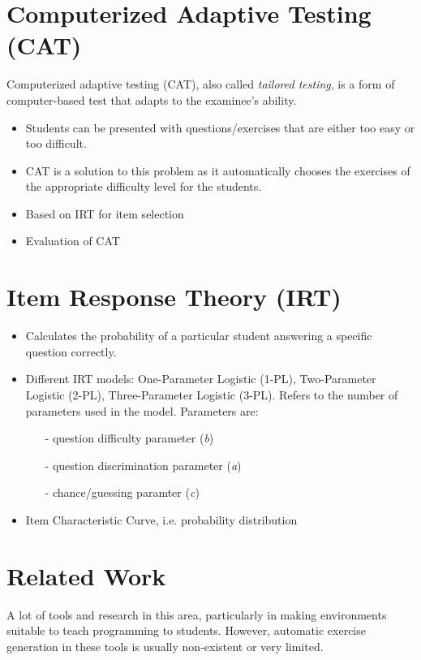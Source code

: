 \documentclass[11pt,a4paper]{report}
\begin{document}
\section{Computerized Adaptive Testing (CAT)}
Computerized adaptive testing (CAT), also called \textit{tailored testing}, is a form of computer-based test that adapts to the examinee's ability.
\begin{itemize}
\item Students can be presented with questions/exercises that are either too easy or too difficult.
\item CAT is a solution to this problem as it automatically chooses the exercises of the appropriate difficulty level for the students.
\item Based on IRT for item selection
\item Evaluation of CAT
\end{itemize}

\section{Item Response Theory (IRT)}

\begin{itemize}
\item Calculates the probability of a particular student answering a specific question correctly.
\item Different IRT models: One-Parameter Logistic (1-PL), Two-Parameter Logistic (2-PL), Three-Parameter Logistic (3-PL). Refers to the number of parameters used in the model. Parameters are: 

\begin{itemize}
\item[-] question difficulty parameter (\textit{b})
\item[-] question discrimination parameter (\textit{a})
\item[-] chance/guessing paramter (\textit{c})
\end{itemize}

\item Item Characteristic Curve, i.e. probability distribution

\end{itemize}


\section{Related Work}
A lot of tools and research in this area, particularly in making environments suitable to teach programming to students. However, automatic exercise generation in these tools is usually non-existent or very limited.
\end{document}
